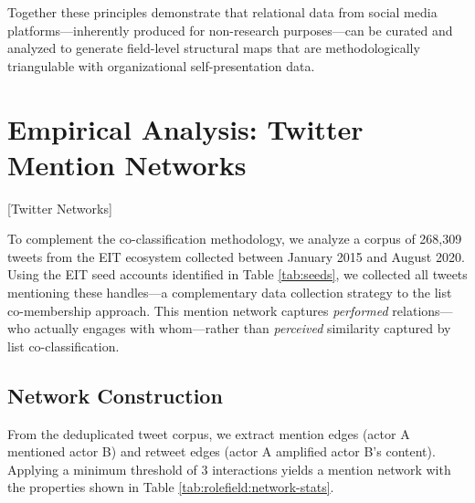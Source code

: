 \documentclass[../main.tex]{subfiles}
\begin{document}
Together these principles demonstrate that relational data from social media platforms---inherently produced for non-research purposes---can be curated and analyzed to generate field-level structural maps that are methodologically triangulable with organizational self-presentation data.


\section{Empirical Analysis: Twitter Mention Networks}[Twitter Networks]

To complement the co-classification methodology, we analyze a corpus of 268,309 tweets from the EIT ecosystem collected between January 2015 and August 2020. Using the EIT seed accounts identified in Table \ref{tab:seeds}, we collected all tweets mentioning these handles---a complementary data collection strategy to the list co-membership approach. This mention network captures \textit{performed} relations---who actually engages with whom---rather than \textit{perceived} similarity captured by list co-classification.

\subsection{Network Construction}

From the deduplicated tweet corpus, we extract mention edges (actor A mentioned actor B) and retweet edges (actor A amplified actor B's content). Applying a minimum threshold of 3 interactions yields a mention network with the properties shown in Table \ref{tab:rolefield:network-stats}.
\end{document}
